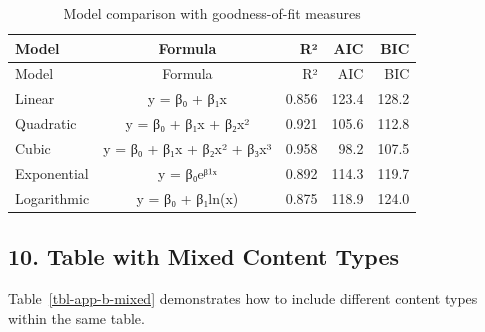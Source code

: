 \documentclass[
  letterpaper,
  oneside,
  openany]{MastersDoctoralThesis}
\begin{document}
\begin{longtable}[]{@{}lcrrr@{}}
\caption{Model comparison with goodness-of-fit
measures}\label{tbl-app-b-r-kable}\tabularnewline
\toprule\noalign{}
Model & Formula & R² & AIC & BIC \\
\midrule\noalign{}
\endfirsthead
\toprule\noalign{}
Model & Formula & R² & AIC & BIC \\
\midrule\noalign{}
\endhead
\bottomrule\noalign{}
\endlastfoot
Linear & y = β₀ + β₁x & 0.856 & 123.4 & 128.2 \\
Quadratic & y = β₀ + β₁x + β₂x² & 0.921 & 105.6 & 112.8 \\
Cubic & y = β₀ + β₁x + β₂x² + β₃x³ & 0.958 & 98.2 & 107.5 \\
Exponential & y = β₀eᵝ¹ˣ & 0.892 & 114.3 & 119.7 \\
Logarithmic & y = β₀ + β₁ln(x) & 0.875 & 118.9 & 124.0 \\
\end{longtable}

\subsection{10. Table with Mixed Content
Types}\label{sec-app-b-mixed-table}

Table~\ref{tbl-app-b-mixed} demonstrates how to include different
content types within the same table.
\end{document}
